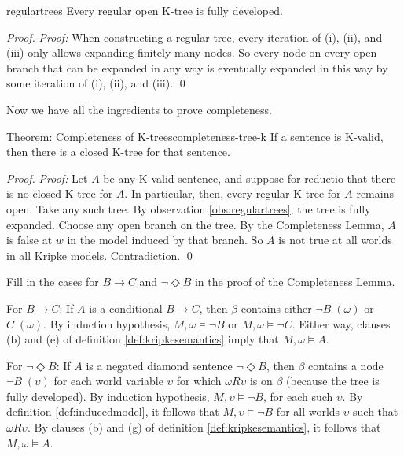 \begin{observation}{regulartrees}
  Every regular open K-tree is fully developed.
\end{observation}
\begin{proof}
  \emph{Proof:} When constructing a regular tree, every iteration of (i), (ii),
  and (iii) only allows expanding finitely many nodes. So every node on every
  open branch that can be expanded in any way is eventually expanded in this way
  by some iteration of (i), (ii), and (iii). \qed
\end{proof}

Now we have all the ingredients to prove completeness.

\begin{theorem}{Theorem: Completeness of K-trees}{completeness-tree-k}
  If a sentence is K-valid, then there is a closed K-tree for that sentence.
\end{theorem}

\begin{proof}
  \emph{Proof:} Let $A$ be any K-valid sentence, and suppose for reductio that
  there is no closed K-tree for $A$. In particular, then, every regular K-tree
  for $A$ remains open. Take any such tree. By observation
  \ref{obs:regulartrees}, the tree is fully expanded. Choose any open branch on
  the tree. By the Completeness Lemma, $A$ is false at $w$ in the model induced
  by that branch. So $A$ is not true at all worlds in all Kripke models.
  Contradiction. \qed
\end{proof}

\begin{exercise}
  Fill in the cases for $B \to C$ and $\neg \Diamond B$ in the proof of the
  Completeness Lemma.
\end{exercise}
\begin{solution}
  For $B\to C$: If $A$ is a conditional $B\to C$, then $\beta$ contains either
  $\neg B \;(\omega)$ or $C \;(\omega)$. By induction hypothesis,
  $M,\omega \models \neg B$ or $M,\omega \models \neg C$. Either way, clauses
  (b) and (e) of definition \ref{def:kripkesemantics} imply that
  $M,\omega \models A$.

  For $\neg\Diamond B$: If $A$ is a negated diamond sentence $\neg\Diamond B$,
  then $\beta$ contains a node $\neg B \;(\upsilon)$ for each world variable
  $\upsilon$ for which $\omega R \upsilon$ is on $\beta$ (because the tree is
  fully developed). By induction hypothesis, $M, \upsilon \models \neg B$, for
  each such $\upsilon$. By definition \ref{def:inducedmodel}, it follows that
  $M,\upsilon \models \neg B$ for all worlds $\upsilon$ such that
  $\omega R \upsilon$. By clauses (b) and (g) of definition
  \ref{def:kripkesemantics}, it follows that $M, \omega \models A$.
\end{solution}

